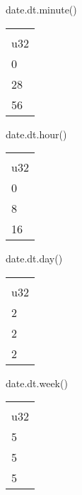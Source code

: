 \documentclass[
  letterpaper,
  DIV=11,
  numbers=noendperiod]{scrartcl}
\newenvironment{Shaded}{\begin{snugshade}}{\end{snugshade}}
\newcommand{\NormalTok}[1]{\textcolor[rgb]{0.00,0.23,0.31}{#1}}
\begin{document}
\begin{Shaded}
\begin{Highlighting}[]
\NormalTok{date.dt.minute()}
\end{Highlighting}
\end{Shaded}

\begin{longtable}[]{@{}l@{}}
\toprule()
 \\
u32 \\
\midrule()
\endhead
0 \\
28 \\
56 \\
\bottomrule()
\end{longtable}

\begin{Shaded}
\begin{Highlighting}[]
\NormalTok{date.dt.hour()}
\end{Highlighting}
\end{Shaded}

\begin{longtable}[]{@{}l@{}}
\toprule()
 \\
u32 \\
\midrule()
\endhead
0 \\
8 \\
16 \\
\bottomrule()
\end{longtable}

\begin{Shaded}
\begin{Highlighting}[]
\NormalTok{date.dt.day()}
\end{Highlighting}
\end{Shaded}

\begin{longtable}[]{@{}l@{}}
\toprule()
 \\
u32 \\
\midrule()
\endhead
2 \\
2 \\
2 \\
\bottomrule()
\end{longtable}

\begin{Shaded}
\begin{Highlighting}[]
\NormalTok{date.dt.week()}
\end{Highlighting}
\end{Shaded}

\begin{longtable}[]{@{}l@{}}
\toprule()
 \\
u32 \\
\midrule()
\endhead
5 \\
5 \\
5 \\
\bottomrule()
\end{longtable}
\end{document}
